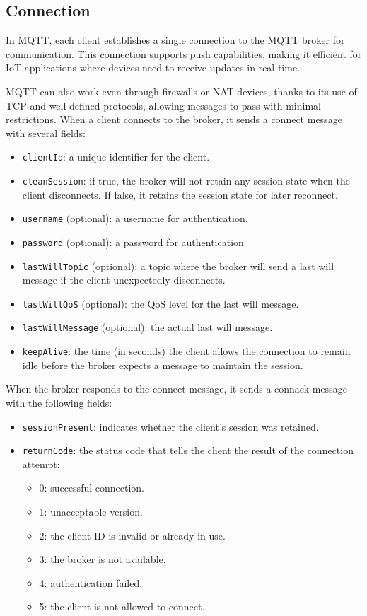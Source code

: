 \subsection{Connection}
In MQTT, each client establishes a single connection to the MQTT broker for communication. 
This connection supports push capabilities, making it efficient for IoT applications where devices need to receive updates in real-time.

MQTT can also work even through firewalls or NAT devices, thanks to its use of TCP and well-defined protocols, allowing messages to pass with minimal restrictions.
When a client connects to the broker, it sends a connect message with several fields:
\begin{itemize}
    \item \texttt{clientId}: a unique identifier for the client.
    \item \texttt{cleanSession}: if true, the broker will not retain any session state when the client disconnects. 
        If false, it retains the session state for later reconnect.
    \item \texttt{username} (optional): a username for authentication.
    \item \texttt{password} (optional): a password for authentication
    \item \texttt{lastWillTopic} (optional): a topic where the broker will send a last will message if the client unexpectedly disconnects.
    \item \texttt{lastWillQoS} (optional): the QoS level for the last will message.
    \item \texttt{lastWillMessage} (optional): the actual last will message.
    \item \texttt{keepAlive}: the time (in seconds) the client allows the connection to remain idle before the broker expects a message to maintain the session.
\end{itemize}
\noindent
When the broker responds to the connect message, it sends a connack message with the following fields:
\begin{itemize}
    \item \texttt{sessionPresent}: indicates whether the client's session was retained.
    \item \texttt{returnCode}: the status code that tells the client the result of the connection attempt:
        \begin{itemize}
            \item 0: successful connection.
            \item 1: unacceptable version.
            \item 2: the client ID is invalid or already in use.
            \item 3: the broker is not available.
            \item 4: authentication failed.
            \item 5: the client is not allowed to connect.
        \end{itemize}
\end{itemize}

